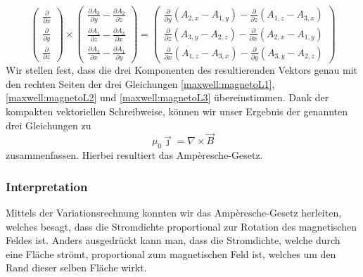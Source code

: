 \begin{equation}
	\renewcommand{\arraystretch}{1.9}
	\begin{pmatrix}
		\displaystyle
		\frac{\partial}{\partial x} \\
		\displaystyle
		\frac{\partial}{\partial y} \\
		\displaystyle
		\frac{\partial}{\partial z}
	\end{pmatrix}
	\times
	\begin{pmatrix}
		\displaystyle
		\frac{\partial A_3}{\partial y} -\frac{\partial A_2}{\partial z}\\
		\displaystyle
		\frac{\partial A_1}{\partial z} -\frac{\partial A_3}{\partial x}\\
		\displaystyle
		\frac{\partial A_2}{\partial x} -\frac{\partial A_1}{\partial y}
	\end{pmatrix}
	=
	\begin{pmatrix}
		\displaystyle
		\frac{\partial}{\partial y}(A_{2,x}-A_{1,y}) - \frac{\partial}{\partial z}(A_{1,z}-A_{3,x})	\\
		\displaystyle
		\frac{\partial}{\partial z}(A_{3,y}-A_{2,z}) - \frac{\partial}{\partial x}(A_{2,x}-A_{1,y}) \\
		\displaystyle
		\frac{\partial}{\partial x}(A_{1,z}-A_{3,x}) - \frac{\partial}{\partial y}(A_{3,y}-A_{2,z})
	\end{pmatrix}
\end{equation}
Wir stellen fest, dass die drei Komponenten des resultierenden Vektors genau mit den rechten Seiten der drei Gleichungen \ref{maxwell:magnetoL1}, \ref{maxwell:magnetoL2} und \ref{maxwell:magnetoL3} übereinstimmen.
Dank der kompakten vektoriellen Schreibweise, können wir unser Ergebnis der genannten drei Gleichungen zu
\[ 
\mu_0\vec{\jmath} 
= 
\nabla \times \vec{B}
 \]
zusammenfassen. Hierbei resultiert das Ampèresche-Gesetz.

\subsubsection{Interpretation}

Mittels der Variationsrechnung konnten wir das Ampèresche-Gesetz herleiten, welches besagt, dass die Stromdichte proportional zur Rotation des magnetischen Feldes ist. Anders ausgedrückt kann man, dass die Stromdichte, welche durch eine Fläche strömt, proportional zum magnetischen Feld ist, welches um den Rand dieser selben Fläche wirkt.


